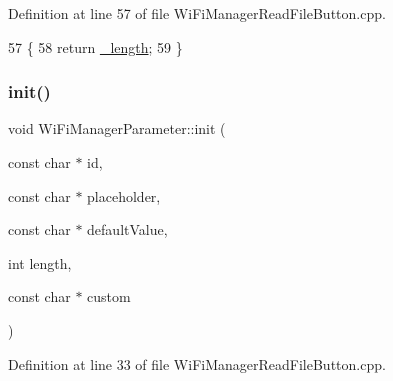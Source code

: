 Definition at line 57 of file Wi\+Fi\+Manager\+Read\+File\+Button.\+cpp.


\begin{DoxyCode}
57                                          \{
58   \textcolor{keywordflow}{return} \hyperlink{class_wi_fi_manager_parameter_a30ca2df3654651a1b5320261a061b774}{\_length};
59 \}
\end{DoxyCode}
\mbox{\label{class_wi_fi_manager_parameter_a137b764027d3851a428f3ab185a5660f}} 
\subsubsection{\texorpdfstring{init()}{init()}}
{\footnotesize\ttfamily void Wi\+Fi\+Manager\+Parameter\+::init (\begin{DoxyParamCaption}\item[{const char $\ast$}]{id,  }\item[{const char $\ast$}]{placeholder,  }\item[{const char $\ast$}]{default\+Value,  }\item[{int}]{length,  }\item[{const char $\ast$}]{custom }\end{DoxyParamCaption})\hspace{0.3cm}{\ttfamily [private]}}



Definition at line 33 of file Wi\+Fi\+Manager\+Read\+File\+Button.\+cpp.


